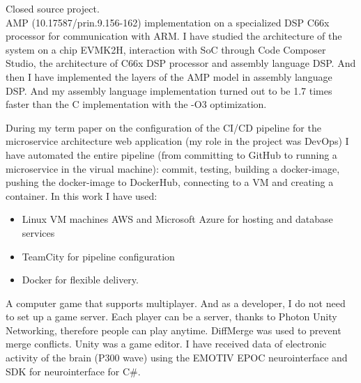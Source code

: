 \documentclass[
	a4paper,
]{fortysecondscv}
\begin{document}
\begin{cvtable}[1.5]
	{Closed source project.}
	{\\ AMP (10.17587/prin.9.156-162) implementation on a specialized DSP C66x processor for communication with ARM. I have studied the architecture of the system on a chip \colorbox{cvsidecolor}{EVMK2H}, interaction with SoC through \colorbox{cvsidecolor}{Code Composer Studio}, the architecture of \colorbox{cvsidecolor}{C66x DSP} processor and \colorbox{cvsidecolor}{assembly language DSP}. And then I have implemented the layers of the AMP model in assembly language DSP. And my assembly language implementation turned out to be 1.7 times faster than the C implementation with the -O3 optimization.}
	{During my term paper on the configuration of the \colorbox{cvsidecolor}{CI/CD} pipeline for the microservice architecture web application (my role in the project was DevOps) I have automated the entire pipeline (from committing to GitHub to running a microservice in the virual machine): commit, testing, building a docker-image, pushing the docker-image to DockerHub, connecting to a VM and creating a container. In this work I have used:
    \begin{itemize}
    \item \colorbox{cvsidecolor}{Linux VM machines} \colorbox{cvsidecolor}{AWS} and \colorbox{cvsidecolor}{Microsoft Azure} for hosting and database services
    \item \colorbox{cvsidecolor}{TeamCity} for pipeline configuration
    \item \colorbox{cvsidecolor}{Docker} for flexible delivery.
    \end{itemize}}
	{A computer game that supports multiplayer. And as a developer, I do not need to set up a game server. Each player can be a server, thanks to \colorbox{cvsidecolor}{Photon Unity Networking}, therefore people can play anytime. \colorbox{cvsidecolor}{DiffMerge} was used to prevent merge conflicts. \colorbox{cvsidecolor}{Unity} was a game editor.}
	{I have received data of electronic activity of the brain (P300 wave) using \colorbox{cvsidecolor}{the EMOTIV EPOC neurointerface} and \colorbox{cvsidecolor}{SDK for neurointerface} for \colorbox{cvsidecolor}{C\#}.}
\end{cvtable}

\cvsignature
\end{document}
